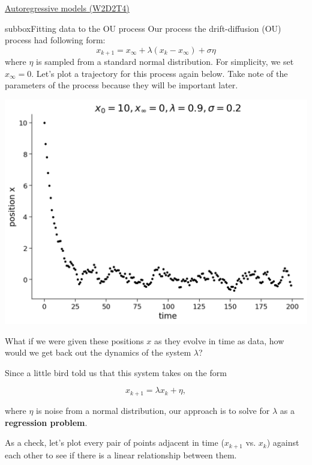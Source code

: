 \begin{textbox}{\href{https://compneuro.neuromatch.io/tutorials/W2D2_LinearSystems/student/W2D2_Tutorial4.html}{Autoregressive models (W2D2T4)} }
\begin{subbox}{subbox}{Fitting data to the OU process}
\scriptsize
 Our process  the drift-diffusion (OU) process had following form:
\[x_{k+1} = x_{\infty} + \lambda(x_k - x_{\infty}) + \sigma \eta\]
where $\eta$ is sampled from a standard normal distribution. 
For simplicity, we set $x_\infty = 0$. Let's plot a trajectory for this process again below. Take note of the parameters of the process because they will be important later.

\begin{center}
\includegraphics[scale=0.14]{Figures/LS/CDS_Figure8.png}
\end{center}
What if we were given these positions $x$ as they evolve in time as data, how would we get back out the dynamics of the system $\lambda$? 

Since a little bird told us that this system takes on the form

$$x_{k+1} = \lambda x_k + \eta,$$

where $\eta$ is noise from a normal distribution, our approach is to solve for $\lambda$ as a \textbf{regression problem}. 

As a check, let's plot every pair of points adjacent in time ($x_{k+1}$ vs. $x_k$) against each other to see if there is a linear relationship between them. 


\end{subbox}
\end{textbox}
